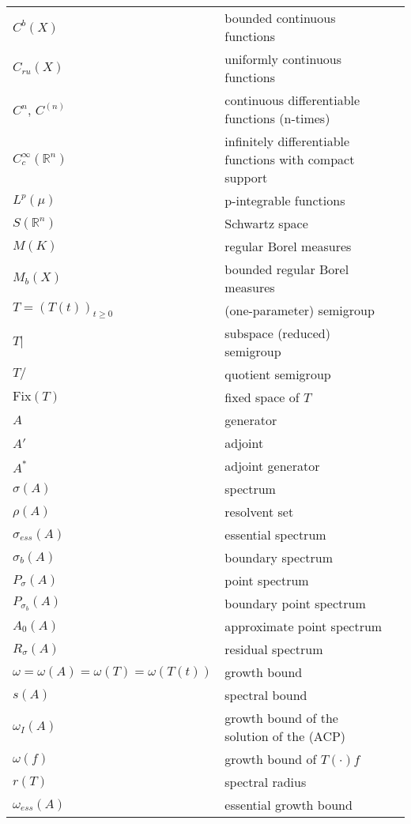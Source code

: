 \begin{longtable}{p{}p{}p{}}
$C^b(X)$ & bounded continuous functions & \\
$C_{ru}(X)$ & uniformly continuous functions & \\
$C^n$, $C^{(n)}$ & continuous differentiable functions (n-times) & \\
$C_c^{\infty}(\mathbb{R}^n)$ & infinitely differentiable functions with compact support & \\
$L^p(\mu)$ & p-integrable functions & \\
$S(\mathbb{R}^n)$ & Schwartz space & \\
$M(K)$ & regular Borel measures & \\
$M_b(X)$ & bounded regular Borel measures & \\
$T = (T(t))_{t \geq 0}$ & (one-parameter) semigroup & \\
$T|$ & subspace (reduced) semigroup & \\
$T/$ & quotient semigroup & \\
$\text{Fix}(T)$ & fixed space of $T$ & \\
%
%
%
$A$ & generator & \\
$A'$ & adjoint & \\
$A^*$ & adjoint generator & \\
$\sigma(A)$ & spectrum & \\
$\rho(A)$ & resolvent set & \\
$\sigma_{ess}(A)$ & essential spectrum & \\
$\sigma_b(A)$ & boundary spectrum & \\
$P_{\sigma}(A)$ & point spectrum & \\
$P_{\sigma_b}(A)$ & boundary point spectrum & \\
$A_0(A)$ & approximate point spectrum & \\
$R_{\sigma}(A)$ & residual spectrum & \\
$\omega = \omega(A) = \omega(T) = \omega(T(t))$ & growth bound & \\
$s(A)$ & spectral bound & \\
$\omega_I(A)$ & growth bound of the solution of the (ACP) & \\
$\omega(f)$ & growth bound of $T(\cdot)f$ & \\
$r(T)$ & spectral radius & \\
$\omega_{ess}(A)$ & essential growth bound & \\

\end{longtable}
